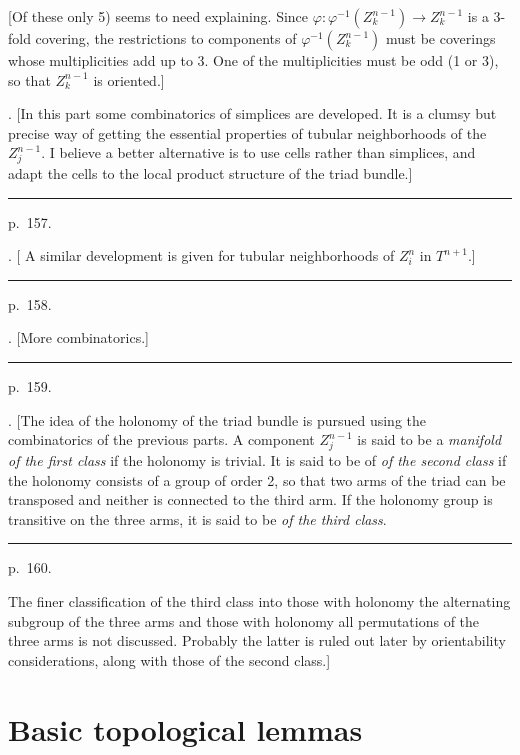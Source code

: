 \documentclass{amsart}
\theoremstyle{plain}
\theoremstyle{definition}
\begin{document}
[Of these only 5) seems to need explaining. Since $\varphi :
\varphi^{-1}(Z^{n-1}_k) \to Z^{n-1}_k$ is a 3-fold covering,
the restrictions to components of $\varphi^{-1}(Z^{n-1}_k)$
must be coverings whose multiplicities add up to 3. One of the
multiplicities must be odd (1 or 3), so that $Z^{n-1}_k$ is
oriented.]

. [In this part some combinatorics of simplices are developed.
It is a clumsy but precise way of getting the essential properties
of tubular neighborhoods of the $Z^{n-1}_j$. I believe a better
alternative is to use cells rather than simplices, and adapt the
cells to the local product structure of the triad bundle.]

\medskip
\hrule\smallskip
\noindent p.~157.
\medskip

. [ A similar development is given for tubular neighborhoods of
$Z^n_i$ in $T^{n+1}$.]

\medskip
\hrule\smallskip
\noindent p.~158.
\medskip

. [More combinatorics.]

\medskip
\hrule\smallskip
\noindent p.~159.
\medskip

. [The idea of the holonomy of the triad bundle is pursued
using the combinatorics of the previous parts. A component
$Z^{n-1}_j$ is said to be a {\em manifold of the first class} if
the holonomy is trivial. It is said to be of {\em of the second
class} if the holonomy consists of a group of order 2, so that
two arms of the triad can be transposed and neither is connected
to the third arm. If the holonomy group is transitive on the three
arms, it is said to be {\em of the third class}.

\medskip
\hrule\smallskip
\noindent p.~160. 
\medskip

The finer
classification of the third class into those with holonomy the
alternating subgroup of the three arms and those with holonomy
all permutations of the three arms is not discussed. Probably the
latter is ruled out later by orientability considerations, along
with those of the second class.]

\section{Basic topological lemmas}\label{sec:basic}
\end{document}
